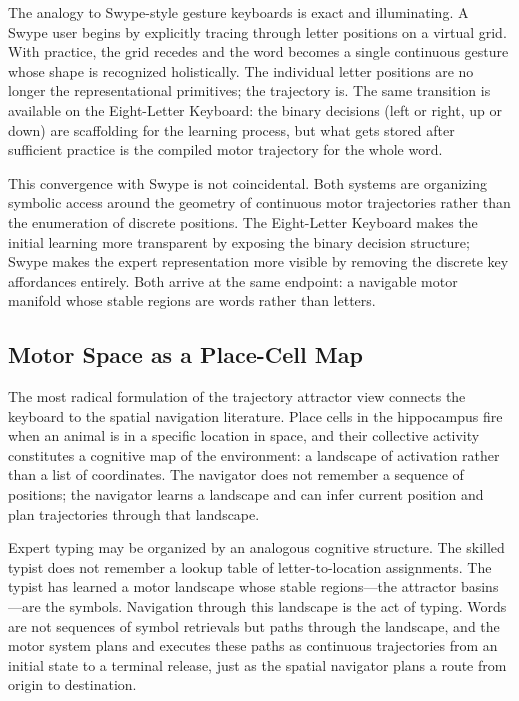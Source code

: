 \documentclass[12pt,a4paper]{article}
\theoremstyle{plain}
\theoremstyle{definition}
\theoremstyle{remark}
\begin{document}
The analogy to Swype-style gesture keyboards is exact and illuminating. A Swype
user begins by explicitly tracing through letter positions on a virtual grid.
With practice, the grid recedes and the word becomes a single continuous gesture
whose shape is recognized holistically. The individual letter positions are no
longer the representational primitives; the trajectory is. The same transition
is available on the Eight-Letter Keyboard: the binary decisions (left or right,
up or down) are scaffolding for the learning process, but what gets stored after
sufficient practice is the compiled motor trajectory for the whole word.

This convergence with Swype is not coincidental. Both systems are organizing
symbolic access around the geometry of continuous motor trajectories rather than
the enumeration of discrete positions. The Eight-Letter Keyboard makes the
initial learning more transparent by exposing the binary decision structure; Swype
makes the expert representation more visible by removing the discrete key
affordances entirely. Both arrive at the same endpoint: a navigable motor
manifold whose stable regions are words rather than letters.

\subsection{Motor Space as a Place-Cell Map}

The most radical formulation of the trajectory attractor view connects the
keyboard to the spatial navigation literature. Place cells in the hippocampus
fire when an animal is in a specific location in space, and their collective
activity constitutes a cognitive map of the environment: a landscape of
activation rather than a list of coordinates. The navigator does not remember
a sequence of positions; the navigator learns a landscape and can infer current
position and plan trajectories through that landscape.

Expert typing may be organized by an analogous cognitive structure. The skilled
typist does not remember a lookup table of letter-to-location assignments.
The typist has learned a motor landscape whose stable regions---the attractor
basins---are the symbols. Navigation through this landscape is the act of
typing. Words are not sequences of symbol retrievals but paths through the
landscape, and the motor system plans and executes these paths as continuous
trajectories from an initial state to a terminal release, just as the spatial
navigator plans a route from origin to destination.
\end{document}
